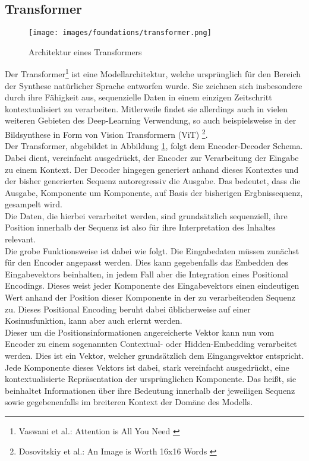 \subsection{Transformer}

\begin{figure}[ht]
    \centering
    \texttt{[image: images/foundations/transformer.png]} 
    \caption{Architektur eines Transformers \cite{vaswani2023attentionneed}}
    \label{fig:transformer}
\end{figure}
Der Transformer\footnote{
    Vaswani et al.: Attention is All You Need
    \cite{vaswani2023attentionneed}
} ist eine Modellarchitektur, welche ursprünglich für den Bereich der Synthese natürlicher Sprache entworfen wurde. Sie zeichnen sich insbesondere durch ihre Fähigkeit aus, sequenzielle Daten in einem einzigen Zeitschritt kontextualisiert zu verarbeiten. Mitlerweile findet sie allerdings auch in vielen weiteren Gebieten des Deep-Learning Verwendung, so auch beispielsweise in der Bildsynthese in Form von Vision Transformern (ViT) \footnote{
    Dosovitskiy et al.: An Image is Worth 16x16 Words 
    \cite{dosovitskiy2021imageworth16x16words}
}. \\ 
Der Transformer, abgebildet in Abbildung \ref{fig:transformer}, folgt dem Encoder-Decoder Schema. Dabei dient, vereinfacht ausgedrückt, der Encoder zur Verarbeitung der Eingabe zu einem Kontext. Der Decoder hingegen generiert anhand dieses Kontextes und der bisher generierten Sequenz autoregressiv die Ausgabe. Das bedeutet, dass die Ausgabe, Komponente um Komponente, auf Basis der bisherigen Ergbnissequenz, gesampelt wird. \\ 
Die Daten, die hierbei verarbeitet werden, sind grundsätzlich sequenziell, ihre Position innerhalb der Sequenz ist also für ihre Interpretation des Inhaltes relevant. \\
Die grobe Funktionsweise ist dabei wie folgt. Die Eingabedaten müssen zunächst für den Encoder angepasst werden. Dies kann gegebenfalls das Embedden des Eingabevektors beinhalten, in jedem Fall aber die Integration eines Positional Encodings. Dieses weist jeder Komponente des Eingabevektors einen eindeutigen Wert anhand der Position dieser Komponente in der zu verarbeitenden Sequenz zu. Dieses Positional Encoding beruht dabei üblicherweise auf einer Kosinusfunktion, kann aber auch erlernt werden. \\
Dieser um die Positionsinformationen angereicherte Vektor kann nun vom Encoder zu einem sogenannten Contextual- oder Hidden-Embedding verarbeitet werden. Dies ist ein Vektor, welcher grundsätzlich dem Eingangsvektor entspricht. Jede Komponente dieses Vektors ist dabei, stark vereinfacht ausgedrückt, eine kontextualisierte Repräsentation der ursprünglichen Komponente. Das heißt, sie beinhaltet Informationen über ihre Bedeutung innerhalb der jeweiligen Sequenz sowie gegebenenfalls im breiteren Kontext der Domäne des Modells. \\
